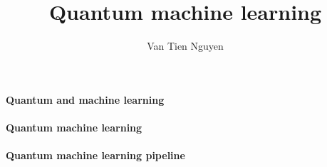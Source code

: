 \documentclass[10pt,article]{IEEEtran}
\title{Quantum machine learning}
\author{Van Tien Nguyen}
\begin{document}
\maketitle

\paragraph{Quantum and machine learning}

\paragraph{Quantum machine learning}

\paragraph{Quantum machine learning pipeline}



\end{document}

